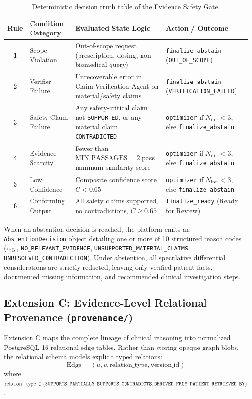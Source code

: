 \documentclass[12pt,a4paper]{report}
\begin{document}
\begin{table}[H]
\centering
\caption{Deterministic decision truth table of the Evidence Safety Gate.}
\label{tab:safety_gate_rules}
\small
\begin{tabularx}{\textwidth}{clp{7.5cm}X}
\toprule
\textbf{Rule} & \textbf{Condition Category} & \textbf{Evaluated State Logic} & \textbf{Action / Outcome} \\
\midrule
\textbf{1} & Scope Violation & Out-of-scope request (prescription, dosing, non-biomedical query) & \texttt{finalize\_abstain} (\texttt{OUT\_OF\_SCOPE}) \\
\textbf{2} & Verifier Failure & Unrecoverable error in Claim Verification Agent on material/safety claims & \texttt{finalize\_abstain} (\texttt{VERIFICATION\_FAILED}) \\
\textbf{3} & Safety Claim Failure & Any safety-critical claim not \texttt{SUPPORTED}, or any material claim \texttt{CONTRADICTED} & \texttt{optimizer} if $N_{\text{iter}} < 3$, else \texttt{finalize\_abstain} \\
\textbf{4} & Evidence Scarcity & Fewer than $\text{MIN\_PASSAGES} = 2$ pass minimum similarity score & \texttt{optimizer} if $N_{\text{iter}} < 3$, else \texttt{finalize\_abstain} \\
\textbf{5} & Low Confidence & Composite confidence score $C < 0.65$ & \texttt{optimizer} if $N_{\text{iter}} < 3$, else \texttt{finalize\_abstain} \\
\textbf{6} & Conforming Output & All safety claims supported, no contradictions, $C \ge 0.65$ & \texttt{finalize\_ready} (Ready for Review) \\
\bottomrule
\end{tabularx}
\end{table}

When an abstention decision is reached, the platform emits an \texttt{AbstentionDecision} object detailing one or more of 10 structured reason codes (e.g., \texttt{NO\_RELEVANT\_EVIDENCE}, \texttt{UNSUPPORTED\_MATERIAL\_CLAIMS}, \texttt{UNRESOLVED\_CONTRADICTION}). Under abstention, all speculative differential considerations are strictly redacted, leaving only verified patient facts, documented missing information, and recommended clinical investigation steps.

\subsection{Extension C: Evidence-Level Relational Provenance (\texttt{provenance/})}
Extension C maps the complete lineage of clinical reasoning into normalized PostgreSQL 16 relational edge tables. Rather than storing opaque graph blobs, the relational schema models explicit typed relations:
\begin{equation}
    \text{Edge} = (u, v, \text{relation\_type}, \text{version\_id})
\end{equation}
where $\text{relation\_type} \in \{\text{\texttt{SUPPORTS}}, \text{\texttt{PARTIALLY\_SUPPORTS}}, \text{\texttt{CONTRADICTS}}, \text{\texttt{DERIVED\_FROM\_PATIENT}}, \text{\texttt{RETRIEVED\_BY}}\}$.
\end{document}
